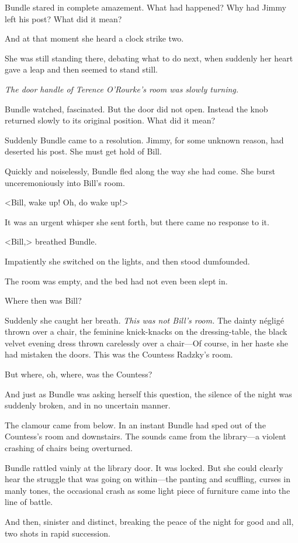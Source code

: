 Bundle stared in complete amazement. What had happened? Why had Jimmy left his post? What did it mean?

And at that moment she heard a clock strike two.

She was still standing there, debating what to do next, when suddenly her heart gave a leap and then seemed to stand still.

\emph{The door handle of Terence O'Rourke's room was slowly turning.}

Bundle watched, fascinated. But the door did not open. Instead the knob returned slowly to its original position. What did it mean?

Suddenly Bundle came to a resolution. Jimmy, for some unknown reason, had deserted his post. She must get hold of Bill.

Quickly and noiselessly, Bundle fled along the way she had come. She burst unceremoniously into Bill's room.

<Bill, wake up! Oh, do wake up!>

It was an urgent whisper she sent forth, but there came no response to it.

<Bill,> breathed Bundle.

Impatiently she switched on the lights, and then stood dumfounded.

The room was empty, and the bed had not even been slept in.

Where then was Bill?

Suddenly she caught her breath. \emph{This was not Bill's room.} The dainty négligé thrown over a chair, the feminine knick-knacks on the dressing-table, the black velvet evening dress thrown carelessly over a chair—Of course, in her haste she had mistaken the doors. This was the Countess Radzky's room.

But where, oh, where, was the Countess?

And just as Bundle was asking herself this question, the silence of the night was suddenly broken, and in no uncertain manner.

The clamour came from below. In an instant Bundle had sped out of the Countess's room and downstairs. The sounds came from the library—a violent crashing of chairs being overturned.

Bundle rattled vainly at the library door. It was locked. But she could clearly hear the struggle that was going on within—the panting and scuffling, curses in manly tones, the occasional crash as some light piece of furniture came into the line of battle.

And then, sinister and distinct, breaking the peace of the night for good and all, two shots in rapid succession.
